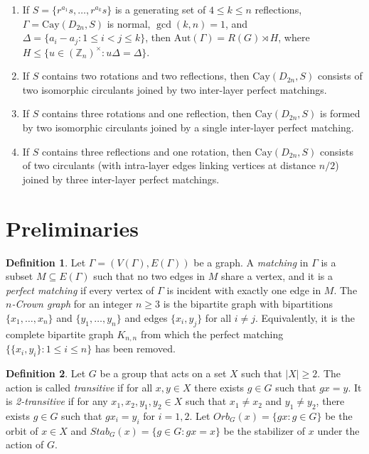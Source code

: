 \documentclass[12pt,reqno,a4paper]{amsart}
\theoremstyle{definition}
\newtheorem{defn}{Definition}[section]
\begin{document}
\begin{enumerate}
    \item If $S=\{r^{a_1}s,\ldots,r^{a_k}s\}$ is a generating set of $4\le k\le n$ reflections, $\Gamma=\mathrm{Cay}(D_{2n},S)$ is normal, $\gcd(k,n)=1$, and \(\Delta=\{a_i-a_j : 1\le i<j\le k\}\), then 
    $\mathrm{Aut}(\Gamma)=R(G)\rtimes H$,
    where 
    $
    H\le \{u\in(\mathbb{Z}_n)^\times : u\Delta=\Delta\}.
    $

    \item If $S$ contains two rotations and two reflections, then $\mathrm{Cay}(D_{2n},S)$ consists of two isomorphic circulants joined by two inter-layer perfect matchings.

    \item If $S$ contains three rotations and one reflection, then $\mathrm{Cay}(D_{2n},S)$ is formed by two isomorphic circulants joined by a single inter-layer perfect matching.

    \item If $S$ contains three reflections and one rotation, then $\mathrm{Cay}(D_{2n},S)$ consists of two circulants (with intra-layer edges linking vertices at distance $n/2$) joined by three inter-layer perfect matchings.
\end{enumerate}


\section{Preliminaries}

\begin{defn}\label{Definition 21}
Let $\Gamma = (V(\Gamma),E(\Gamma))$ be a graph. A \emph{matching} in $\Gamma$ is a subset $M \subseteq E(\Gamma)$ such that no two edges in $M$ share a vertex, and it is a \emph{perfect matching} if every vertex of $\Gamma$ is incident with exactly one edge in $M$.
The \emph{$n$-Crown graph} for an integer $n \ge 3$ is the bipartite graph with bipartitions 
$\{x_1,\dots,x_n\}$ and $\{y_1,\dots,y_n\}$ and edges
$\{x_i,y_j\}$ for all $i\ne j$.  
Equivalently, it is  the complete bipartite graph  $K_{n,n}$ from which the perfect matching $\{\{x_i, y_i\} : 1\le i\le n\}$ has been removed.
\end{defn}

\begin{defn}\label{Definition 2.2}
Let $G$ be a group that acts on a set $X$ such that $\vert X\vert \geq 2$. 
The action is called \emph{transitive} if for all $x,y \in X$ there exists $g \in G$ such that $gx = y$.  
It is \emph{2-transitive} if for any $x_{1},x_{2},y_{1},y_{2}\in X$ such that $x_{1}\neq x_{2}$ and $y_{1}\neq y_{2}$, there exists $g \in G$ such that 
$g x_i = y_i$ for $i = 1,2$.
Let $Orb_{G}(x)=\{gx:g\in G\}$ be the orbit of $x \in X$ and $Stab_{G}(x)=\{g\in G: gx=x\}$ be the stabilizer of $x$ under the action of $G$. 
\end{defn}
\end{document}
